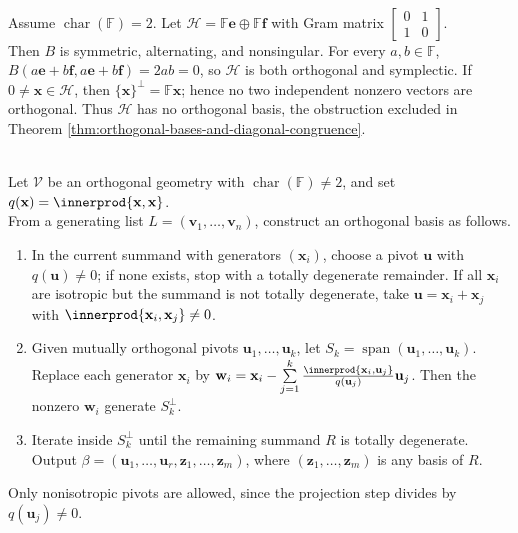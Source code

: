 \begin{example} \label{ex:characteristic-two-orthogonal-symplectic-plane} \\
Assume $\operatorname{char}(\mathbb{F})=2$. Let $\mathcal{H}=\mathbb{F}\mathbf{e}\oplus\mathbb{F}\mathbf{f}$ with Gram matrix $\begin{bmatrix}
0&1\\
1&0
\end{bmatrix}$.\\
Then $B$ is symmetric, alternating, and nonsingular. For every $a,b\in\mathbb{F}$, $B(a\mathbf{e}+b\mathbf{f},a\mathbf{e}+b\mathbf{f})=2ab=0$, so $\mathcal{H}$ is both orthogonal and symplectic. If $0\neq\mathbf{x}\in\mathcal{H}$, then $\{\mathbf{x}\}^{\perp}=\mathbb{F}\mathbf{x}$; hence no two independent nonzero vectors are orthogonal. Thus $\mathcal{H}$ has no orthogonal basis, the obstruction excluded in Theorem \ref{thm:orthogonal-bases-and-diagonal-congruence}.
\end{example}

\begin{method} \label{meth:lagrange-orthogonalization-arbitrary-field} \\
Let $\mathcal{V}$ be an orthogonal geometry with $\operatorname{char}(\mathbb{F})\neq2$, and set $q(\mathbf{x})=\innerprod{\mathbf{x},\mathbf{x}}$.\\
From a generating list $L=(\mathbf{v}_1,\ldots,\mathbf{v}_n)$, construct an orthogonal basis as follows.
\begin{enumerate}[label=(\roman*)]
\setlength{\itemsep}{0pt}
\item In the current summand with generators $(\mathbf{x}_i)$, choose a pivot $\mathbf{u}$ with $q(\mathbf{u})\neq0$; if none exists, stop with a totally degenerate remainder. If all $\mathbf{x}_i$ are isotropic but the summand is not totally degenerate, take $\mathbf{u}=\mathbf{x}_i+\mathbf{x}_j$ with $\innerprod{\mathbf{x}_i,\mathbf{x}_j}\neq0$.
\item Given mutually orthogonal pivots $\mathbf{u}_1,\ldots,\mathbf{u}_k$, let $S_k=\operatorname{span}(\mathbf{u}_1,\ldots,\mathbf{u}_k)$.\\
Replace each generator $\mathbf{x}_i$ by $\mathbf{w}_i = \mathbf{x}_i-\sum\limits_{j=1}^{k} \frac{\innerprod{\mathbf{x}_i,\mathbf{u}_j}}{q(\mathbf{u}_j)}\mathbf{u}_j$. Then the nonzero $\mathbf{w}_i$ generate $S_k^{\perp}$.
\item Iterate inside $S_k^{\perp}$ until the remaining summand $R$ is totally degenerate.\\
Output $\beta=(\mathbf{u}_1,\ldots,\mathbf{u}_r,\mathbf{z}_1,\ldots,\mathbf{z}_m)$, where $(\mathbf{z}_1,\ldots,\mathbf{z}_m)$ is any basis of $R$.
\end{enumerate}
Only nonisotropic pivots are allowed, since the projection step divides by $q(\mathbf{u}_j)\neq0$.
\end{method}

